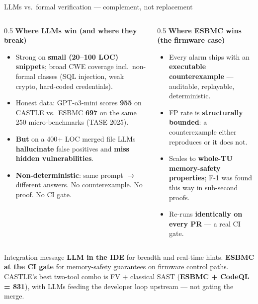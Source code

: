 \documentclass[aspectratio=169,11pt]{beamer}
\newcommand{\hil}[1]{\textbf{\textcolor{nvgreendark}{#1}}}
\newcommand{\bad}[1]{\textbf{\textcolor{nvred}{#1}}}
\begin{document}
\begin{frame}{LLMs vs.\ formal verification --- complement, not replacement}
  \begin{columns}[T,onlytextwidth]
    \begin{column}{0.5\textwidth}
      \footnotesize
      \textbf{Where LLMs win (and where they break)}
      \begin{itemize}\setlength\itemsep{0.1em}
        \item Strong on \hil{small (20--100 LOC) snippets}; broad CWE
              coverage incl.\ non-formal classes (SQL injection,
              weak crypto, hard-coded credentials).
        \item Honest data: GPT-o3-mini scores \hil{955} on CASTLE
              vs.\ ESBMC \hil{697} on the same 250 micro-benchmarks
              (TASE 2025).
        \item \bad{But} on a 400+ LOC merged file LLMs
              \bad{hallucinate} false positives and \bad{miss hidden
              vulnerabilities}.
        \item \bad{Non-deterministic}: same prompt $\to$ different
              answers. No counterexample. No proof. No CI gate.
      \end{itemize}
    \end{column}

    \begin{column}{0.5\textwidth}
      \footnotesize
      \textbf{Where ESBMC wins (the firmware case)}
      \begin{itemize}\setlength\itemsep{0.1em}
        \item Every alarm ships with an \hil{executable
              counterexample} --- auditable, replayable, deterministic.
        \item FP rate is \hil{structurally bounded}: a counterexample
              either reproduces or it does not.
        \item Scales to \hil{whole-TU memory-safety properties}; F-1
              was found this way in sub-second proofs.
        \item Re-runs \hil{identically on every PR} --- a real CI gate.
      \end{itemize}
    \end{column}
  \end{columns}

  \vspace{0.5em}
  \begin{block}{Integration message}
    \scriptsize
    \hil{LLM in the IDE} for breadth and real-time hints.
    \hil{ESBMC at the CI gate} for memory-safety guarantees on firmware
    control paths. CASTLE's best two-tool combo is FV + classical SAST
    (\hil{ESBMC + CodeQL = 831}), with LLMs feeding the developer loop
    upstream --- not gating the merge.
  \end{block}
\end{frame}
\end{document}
